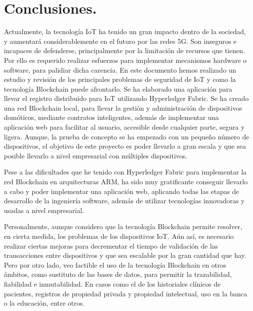 \section{Conclusiones.}

Actualmente, la tecnología IoT ha tenido un gran impacto dentro de la sociedad, y aumentará considerablemente en el 
futuro por las redes 5G. Son inseguros e incapaces de defenderse, principalmente por la limitación de recursos que tienen. 
Por ello es requerido realizar esfuerzos para implementar mecanismos hardware o software, para palidiar dicha carencia. 
En este documento hemos realizado un estudio y revisión de los principales problemas de seguridad de IoT y como la 
tecnología Blockchain puede afrontarlo. Se ha elaborado una aplicación para llevar el registro distribuido para IoT 
utilizando Hyperledger Fabric. Se ha creado una red Blockchain local, para llevar la gestión y administración de dispositivos 
domóticos, mediante contratos inteligentes, además de implementar una aplicación web para facilitar al usuario, accesible 
desde cualquier parte, segura y ligera. Aunque, la prueba de concepto se ha empezado con un pequeño número de dispositivos,
el objetivo de este proyecto es poder llevarlo a gran escala y que sea posible llevarlo a nivel empresarial con múltiples
dispositivos.  

\vspace{5mm}

\noindent Pese a las dificultades que he tenido con Hyperledger Fabric para implementar la red Blockchain en arquitecturas 
ARM, ha sido muy gratificante conseguir llevarlo a cabo y poder implementar una aplicación web, aplicando todas las etapas 
de desarrollo de la ingeniería software, además de utilizar tecnologías innovadoras y usadas a nivel empresarial.

\vspace{5mm}

\noindent Personalmente, aunque considero que la tecnología Blockchain permite resolver, en cierta medida, los problemas 
de los dispositivos IoT. Aún así, es necesario realizar ciertas mejoras para decrementar el tiempo de validación de las 
transacciones entre dispositivos y que sea escalable por la gran cantidad que hay. Pero por otro lado, veo factible el uso 
de la tecnología Blockchain en otros ámbitos, como sustituto de las bases de datos, para permitir la trazabilidad, fiabilidad 
e inmutabilidad. En casos como el de los historiales clínicos de pacientes, registros de propiedad privada y propiedad 
intelectual, uso en la banca o la educación, entre otros.

